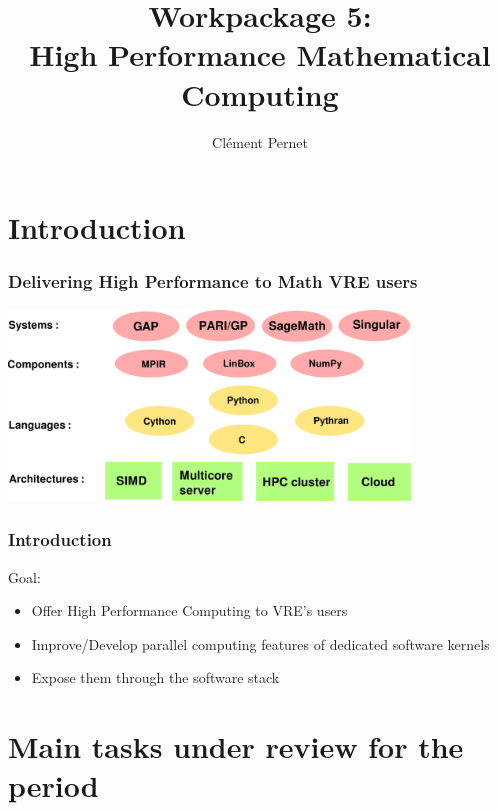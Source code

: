 \documentclass{beamer}
\title[Workpackage 5]{Workpackage 5:\\ High Performance Mathematical Computing}
\author{Clément Pernet}
\institute[UGA]{Université Grenoble Alpes}
\begin{document}
\maketitle

\section*{Introduction}
\begin{frame}
  \frametitle{Delivering High Performance to Math VRE users}
   \begin{center}
    \includegraphics[width=0.8\textwidth]{software_stack}
    
  \end{center}
  
\end{frame}

\begin{frame}
  \frametitle{Introduction}
  \begin{block}
    {Goal:}
    \begin{itemize}
    \item Offer High Performance Computing to VRE's users
    \item Improve/Develop parallel computing features of dedicated software
      kernels
    \item Expose them through the software stack
    \end{itemize}
  \end{block}
\end{frame}
\section{Main tasks under review for the period}
\end{document}
